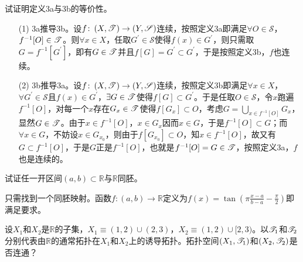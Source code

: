 \begin{xiti}
	\item 试证明定义3a与3b的等价性。

	\begin{zm}
		\begin{enumerate}
			\item[(1)] 3a推导3b。设$f\colon \left(X,\mathscr{T} \right)\rightarrow\left(Y,\mathscr{S}\right) $连续，按照定义3a即满足$\forall O\in\mathscr{S} $，$f^{-1}[O]\in\mathscr{T} $。则$\forall x\in X$，任取$G^\prime\in\mathscr{S} $使得$f(x)\in G^\prime $，则只需取$G=f^{-1}[G^\prime] $，即有$G\in\mathscr{T} $并且$f[G]=G^\prime \subset G^\prime $，于是按照定义3b，$f$也连续。
			\item[(2)] 3b推导3a。设$f\colon \left(X,\mathscr{T} \right)\rightarrow\left(Y,\mathscr{S}\right) $连续，按照定义3b即满足$\forall x\in X $，$\forall G^\prime\in \mathscr{S} $且$f(x)\in G^\prime $，$\exists G\in \mathscr{T} $使得$f[G]\subset G^\prime $。于是任取$O\in \mathscr{S} $，令$x$跑遍$f^{-1}[O]$，对每一个$x$存在$G_x\in \mathscr{T}$使得$f[G_x]\subset O $，考虑$\displaystyle G=\bigcup_{x\in f^{-1}[O]} G_x $，显然$G\in\mathscr{T} $。由于$x\in f^{-1}[O] $，$x\in G_x $因而$x\in G $，于是$f^{-1}[O]\subset G $；而$\forall x\in G $，不妨设$x\in G_{x_0}$，则由于$f[G_{x_0}]\subset O $，知$x\in f^{-1}[O] $，故又有$G\subset f^{-1}[O] $，于是$G$正是$f^{-1}[O] $，也就是$f^{-1}[O]=G\in \mathscr{T} $，按照定义3a，$f$也是连续的。

		\end{enumerate}
	\end{zm}

	\item 试证任一开区间$(a,b)\subset \mathbb{R} $与$\mathbb{R} $同胚。

	\begin{zm}
		只需找到一个同胚映射。函数$f\colon (a,b)\rightarrow \mathbb{R} $定义为$\displaystyle f(x)=\tan(\pi\frac{x-a}{b-a}-\frac{\pi}{2}) $即满足要求。
	\end{zm}

	\item 设$X_1 $和$X_2$是$\mathbb{R}$的子集，$X_1\equiv(1,2)\cup(2,3) $，$X_2\equiv(1,2)\cup[2,3)$。以$\mathscr{T}_1$和$\mathscr{T}_2$分别代表由$\mathbb{R}$的通常拓扑在$X_1$和$X_2$上的诱导拓扑。拓扑空间$(X_1,\mathscr{T}_1)$和$(X_2,\mathscr{T}_2)$是否连通？


\end{xiti}
